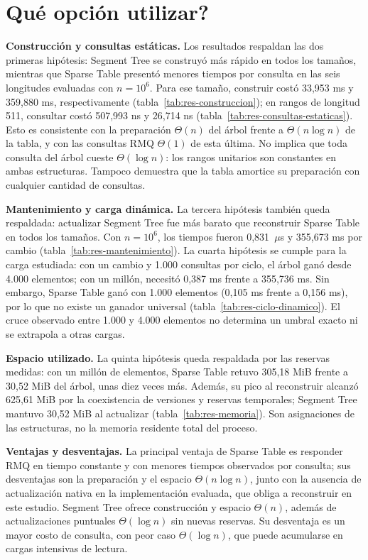 \section{\textquestiondown Qué opción utilizar?}

\textbf{Construcción y consultas estáticas.} Los resultados respaldan las
dos primeras hipótesis: Segment Tree se construyó más rápido en todos los
tamaños, mientras que Sparse Table presentó menores tiempos por consulta
en las seis longitudes evaluadas con \(n=10^6\). Para ese tamaño, construir
costó 33,953 ms y 359,880 ms, respectivamente
(tabla~\ref{tab:res-construccion}); en rangos de longitud 511, consultar
costó 507,993 ns y 26,714 ns (tabla~\ref{tab:res-consultas-estaticas}).
Esto es consistente con la preparación \(\Theta(n)\) del árbol frente a
\(\Theta(n\log n)\) de la tabla, y con las consultas RMQ \(\Theta(1)\)
de esta última. No implica que toda consulta del árbol cueste
\(\Theta(\log n)\): los rangos unitarios son constantes en ambas
estructuras. Tampoco demuestra que la tabla amortice su preparación con
cualquier cantidad de consultas.

\textbf{Mantenimiento y carga dinámica.} La tercera hipótesis también
queda respaldada: actualizar Segment Tree fue más barato que reconstruir
Sparse Table en todos los tamaños. Con \(n=10^6\), los tiempos fueron
0,831~\(\mu\)s y 355,673 ms por cambio
(tabla~\ref{tab:res-mantenimiento}). La cuarta hipótesis se cumple para
la carga estudiada: con un cambio y 1.000 consultas por ciclo, el árbol
ganó desde 4.000 elementos; con un millón, necesitó 0,387 ms frente a
355,736 ms. Sin embargo, Sparse Table ganó con 1.000 elementos
(0,105 ms frente a 0,156 ms), por lo que no existe un ganador universal
(tabla~\ref{tab:res-ciclo-dinamico}). El cruce observado entre 1.000 y
4.000 elementos no determina un umbral exacto ni se extrapola a otras cargas.

\textbf{Espacio utilizado.} La quinta hipótesis queda respaldada por
las reservas medidas: con un millón de elementos, Sparse Table retuvo
305,18 MiB frente a 30,52 MiB del árbol, unas diez veces más. Además,
su pico al reconstruir alcanzó 625,61 MiB por la coexistencia de versiones
y reservas temporales; Segment Tree mantuvo 30,52 MiB al actualizar
(tabla~\ref{tab:res-memoria}). Son asignaciones de las estructuras,
no la memoria residente total del proceso.

\textbf{Ventajas y desventajas.} La principal ventaja de Sparse Table
es responder RMQ en tiempo constante y con menores tiempos observados
por consulta; sus desventajas son la preparación y el espacio
\(\Theta(n\log n)\), junto con la ausencia de actualización nativa en
la implementación evaluada, que obliga a reconstruir en este estudio.
Segment Tree ofrece construcción y espacio \(\Theta(n)\), además de
actualizaciones puntuales \(\Theta(\log n)\) sin nuevas reservas.
Su desventaja es un mayor costo de consulta, con peor caso
\(\Theta(\log n)\), que puede acumularse en cargas intensivas de lectura.

